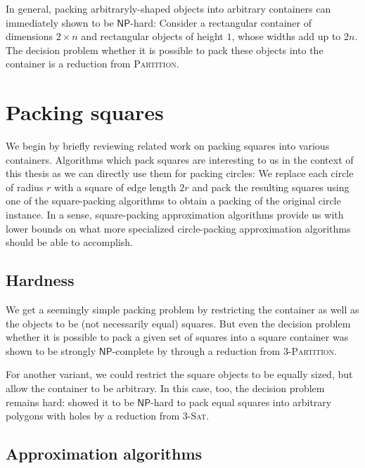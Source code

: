 \documentclass[a4paper,style=print,bibliography=totoc,nexus,lnum,extramargin]{tubsbook}
\begin{document}
In general, packing arbitraryly-shaped objects into arbitrary containers can immediately shown to be $\mathsf{NP}$-hard: Consider a rectangular container of dimensions $2 \times n$ and rectangular objects of height $1$, whose widths add up to $2n$. The decision problem whether it is possible to pack these objects into the container is a reduction from \textsc{Partition}.

\section{Packing squares}\label{sec:related-squares}

We begin by briefly reviewing related work on packing squares into various containers.
Algorithms which pack squares are interesting to us in the context of this thesis as we can directly use them for packing circles: We replace each circle of radius $r$ with a square of edge length $2r$ and pack the resulting squares using one of the square-packing algorithms to obtain a packing of the original circle instance. In a sense, square-packing approximation algorithms provide us with lower bounds on what more specialized circle-packing approximation algorithms should be able to accomplish.

\subsection{Hardness}

We get a seemingly simple packing problem by restricting the container as well as the objects to be (not necessarily equal) squares.
But even the decision problem whether it is possible to pack a given set of squares into a square container was shown to be strongly $\mathsf{NP}$-complete by \textcite{LTWYC1990packing} through a reduction from \textsc{3-Partition}.

For another variant, we could restrict the square objects to be equally sized, but allow the container to be arbitrary.
In this case, too, the decision problem remains hard:
\textcite{FPT1981optimal} showed it to be $\mathsf{NP}$-hard to pack equal squares into arbitrary polygons with holes by a reduction from \textsc{3-Sat}.

\subsection{Approximation algorithms}
\end{document}
